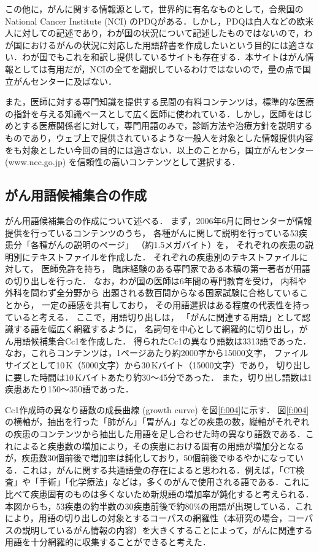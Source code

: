 \documentclass[japanese]{jnlp_1.4}
\begin{document}
この他に，がんに関する情報源として，世界的に有名なものとして，合衆国の National Cancer Institute (NCI) のPDQ\cite{c14}がある．しかし，PDQは白人などの欧米人に対しての記述であり，わが国の状況について記述したものではないので，わが国におけるがんの状況に対応した用語辞書を作成したいという目的には適さない．わが国でもこれを和訳し提供しているサイトも存在する\cite{c15}．本サイトはがん情報としては有用だが，NCIの全てを翻訳しているわけではないので，量の点で国立がんセンターに及ばない．

また，医師に対する専門知識を提供する民間の有料コンテンツ\cite{c16}は，標準的な医療の指針を与える知識ベースとして広く医師に使われている．しかし，医師をはじめとする医療関係者に対して，専門用語のみで，診断方法や治療方針を説明するものであり，ウェブ上で提供されているような一般人を対象とした情報提供内容をも対象としたい今回の目的には適さない．以上のことから，国立がんセンター(www.ncc.go.jp) を信頼性の高いコンテンツとして選択する．



\subsection{がん用語候補集合の作成}
\label{s:がん用語候補集合の作成}

がん用語候補集合の作成について述べる．
まず，2006年6月に同センターが情報提供を行っているコンテンツのうち，
各種がんに関して説明を行っている53疾患分「各種がんの説明のページ」
（約1.5メガバイト）を，
それぞれの疾患の説明別にテキストファイルを作成した．
それぞれの疾患別のテキストファイルに対して，
医師免許を持ち，
臨床経験のある専門家である本稿の第一著者が用語の切り出しを行った．
なお，わが国の医師は6年間の専門教育を受け，
内科や外科を問わず全分野から
出題される数百問からなる国家試験に合格していることから，
一定の語感を共有しており，
その用語選択はある程度の代表性を持っていると考える．
ここで，用語切り出しは，
「がんに関連する用語」として認識する語を幅広く網羅するように，
名詞句を中心として網羅的に切り出し，がん用語候補集合Cc1を作成した．
得られたCc1の異なり語数は3313語であった．
なお，これらコンテンツは，1ページあたり約2000字から15000文字，
ファイルサイズとして10\,K（5000文字）から30\,Kバイト（15000文字）であり，
切り出しに要した時間は10\,Kバイトあたり約30〜45分であった．
また，切り出し語数は1疾患あたり150〜350語であった．

Cc1作成時の異なり語数の成長曲線 (growth curve) を図\ref{f:004}に示す．
図\ref{f:004}の横軸が，抽出を行った「肺がん」「胃がん」などの疾患の数，縦軸がそれぞれの疾患のコンテンツから抽出した用語を足し合わせた時の異なり語数である．これによると疾患数の増加により，その疾患における固有の用語が増加分となるが，疾患数30個前後で増加率は鈍化しており，50個前後でゆるやかになっている．これは，がんに関する共通語彙の存在によると思われる．例えば，「CT検査」や「手術」「化学療法」などは，多くのがんで使用される語である．これに比べて疾患固有のものは多くないため新規語の増加率が鈍化すると考えられる．本図からも，53疾患の約半数の30疾患前後で約80\%の用語が出現している．これにより，用語の切り出しの対象とするコーパスの網羅性（本研究の場合，コーパスの説明しているがん情報の内容）を大きくすることによって，がんに関連する用語を十分網羅的に収集することができると考えた．
\end{document}
